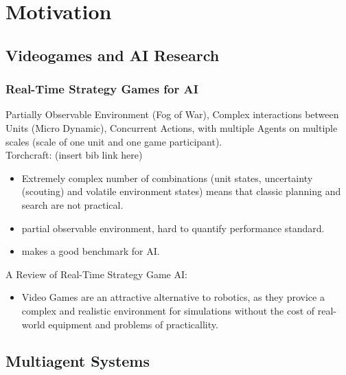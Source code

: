
\chapter{Motivation}
\label{ch:Motivation}

\section{Videogames and AI Research}

\subsection{Real-Time Strategy Games for AI}
\label{ch:Motivation:RTS4AI}
Partially Observable Environment (Fog of War), Complex interactions between Units (Micro Dynamic), Concurrent Actions, with multiple Agents on multiple scales (scale of one unit and one game participant).
\\
Torchcraft: (insert bib link here)
\begin{itemize}[noitemsep,nolistsep]
	\item Extremely complex number of combinations (unit states, uncertainty (scouting) and volatile environment states) means that classic planning and search are not practical. 
	\item partial observable environment, hard to quantify performance standard.
	\item makes a good benchmark for AI.
\end{itemize}
A Review of Real-Time Strategy Game AI:
\begin{itemize}[noitemsep,nolistsep]
	\item Video Games are an attractive alternative to robotics, as they provice a complex and realistic environment for simulations without the cost of real-world equipment and problems of practicallity.
\end{itemize}

\section{Multiagent Systems}

